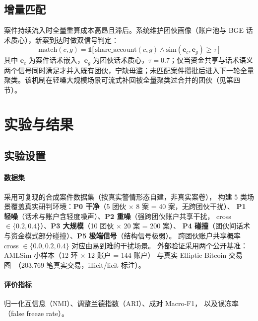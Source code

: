 \documentclass[12pt,a4paper,fontset=windows]{ctexart}
\begin{document}
\subsection{增量匹配}

案件持续流入时全量重算成本高昂且滞后。系统维护团伙画像（账户池与 BGE 话术质心），新案到达时做双信号判定：
\begin{equation}
\text{match}(c, g) = \mathbb{1}\big[\, \text{share\_account}(c, g) \wedge \text{sim}(\mathbf{e}_c, \mathbf{e}_g) \ge \tau \,\big]
\end{equation}
其中 $\mathbf{e}_c$ 为案件话术嵌入，$\mathbf{e}_g$ 为团伙话术质心，$\tau=0.7$；仅当资金共享与话术语义两个信号同时满足才并入既有团伙，宁缺毋滥；未匹配案件攒批后进入下一轮全量聚类。该机制在轻噪大规模场景可流式补回被全量聚类过合并的团伙（见第四节）。

\section{实验与结果}

\subsection{实验设置}

\paragraph{数据集} 采用可复现的合成案件数据集（按真实警情形态自建，非真实案卷），
构建 5 类场景覆盖真实研判环境：\textbf{P0 干净}（5 团伙 $\times$ 8 案 = 40 案，无跨团伙干扰）、
\textbf{P1 轻噪}（话术与账户含轻度噪声）、\textbf{P2 重噪}（强跨团伙账户共享干扰，
cross $\in \{0.2, 0.4\}$）、\textbf{P3 大规模}（10 团伙 $\times$ 20 案 = 200 案）、
\textbf{P4 碰撞}（团伙间话术与资金模式部分碰撞）、\textbf{P5 极端信号}（结构信号极弱）。
跨团伙账户共享概率 cross $\in \{0.0, 0.2, 0.4\}$ 对应由易到难的干扰场景。
外部验证采用两个公开基准：AMLSim 小样本（12 环 $\times$ 12 账户 = 144 账户）
与真实 Elliptic Bitcoin 交易图~\cite{weber2019elliptic}（203{,}769 笔真实交易，illicit/licit 标注）。

\paragraph{评价指标} 归一化互信息（NMI）、调整兰德指数（ARI）、成对 Macro-F1，
以及误冻率（false freeze rate）。
\end{document}
